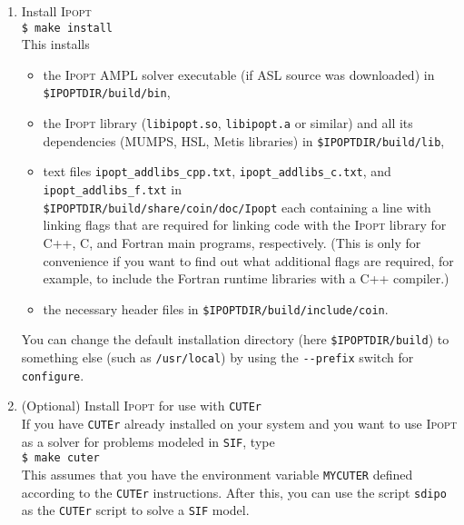 \documentclass[10pt]{article}
\newcommand{\Ipopt}{\textsc{Ipopt}\xspace}
\begin{document}
\begin{enumerate}
  Note: The {\tt configure} script is not able to automatically
  determine the C++ runtime libraries for the C++ compiler.  For
  certain compilers we enabled default values for this, but those
  might not exist or be wrong for your compiler.  In that case, the C
  and Fortran example in the test will most probably fail to compile.
  If you don't want to hook up the compiled \Ipopt library to some
  Fortran or C code that you wrote you don't need to worry about this.
  If you do want to link the \Ipopt library with a C or Fortran
  compiler, you need to find out the C++ runtime libraries (e.g., by
  running the C++ compiler in verbose mode for a simple example
  program) and run {\tt configure} again, and this time specify all
  C++ runtime libraries with the {\tt CXXLIBS} variable (see also
  Appendix~\ref{ExpertInstall}).
\item Install \Ipopt \\
  {\tt \$ make install}\\
  This installs
  \begin{itemize}
  \item the \Ipopt AMPL solver executable (if ASL source was
    downloaded) in \texttt{\$IPOPTDIR/build/bin},
  \item the \Ipopt library (\texttt{libipopt.so}, \texttt{libipopt.a}
    or similar) and all its dependencies (MUMPS, HSL, Metis libraries)
    in \texttt{\$IPOPTDIR/build/lib},
  \item text files {\tt ipopt\_addlibs\_cpp.txt}, {\tt ipopt\_addlibs\_c.txt}, and {\tt
      ipopt\_addlibs\_f.txt} in\\ \texttt{\$IPOPTDIR/build/share/coin/doc/Ipopt} each 
    containing a line with linking flags that are required for
    linking code with the \Ipopt library for C++, C, and Fortran main
    programs, respectively. (This is only for convenience if you want
    to find out what additional flags are required, for example, to
    include the Fortran runtime libraries with a C++ compiler.)
  \item the necessary header files in
    \texttt{\$IPOPTDIR/build/include/coin}.
  \end{itemize}
  You can change the default installation directory (here
  \texttt{\$IPOPTDIR/build}) to something else (such as \texttt{/usr/local})
  by using the \verb|--prefix| switch for \texttt{configure}.
\item (Optional) Install \Ipopt for use with {\tt CUTEr}\\
  If you have {\tt CUTEr} already installed on your system and you
  want to use \Ipopt as a solver for problems modeled in {\tt SIF},
  type\\
  {\tt \$ make cuter}\\
  This assumes that you have the environment variable {\tt MYCUTER}
  defined according to the {\tt CUTEr} instructions.  After this, you
  can use the script {\tt sdipo} as the {\tt CUTEr} script to solve a
  {\tt SIF} model.
\end{enumerate}
\end{document}

